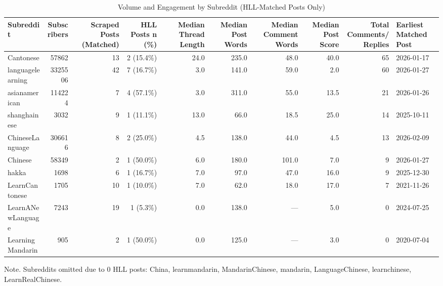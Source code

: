 \documentclass[11pt]{article}
\begin{document}
\begin{table}[ht]
\centering
\begin{threeparttable}
\caption{Volume and Engagement by Subreddit (HLL-Matched Posts Only)}
\vspace{0.35em}
\begin{tabular}{l r r r r r r r r l}
\toprule
Subreddit & Subscribers & Scraped Posts (Matched) & HLL Posts n (\%) & Median Thread Length & Median Post Words & Median Comment Words & Median Post Score & Total Comments/Replies & Earliest Matched Post \\
\midrule
Cantonese & 57862 & 13 & 2 (15.4\%) & 24.0 & 235.0 & 48.0 & 40.0 & 65 & 2026-01-17 \\
languagelearning & 3325506 & 42 & 7 (16.7\%) & 3.0 & 141.0 & 59.0 & 2.0 & 60 & 2026-01-27 \\
asianamerican & 114224 & 7 & 4 (57.1\%) & 3.0 & 311.0 & 55.0 & 13.5 & 21 & 2026-01-26 \\
shanghainese & 3032 & 9 & 1 (11.1\%) & 13.0 & 66.0 & 18.5 & 25.0 & 14 & 2025-10-11 \\
ChineseLanguage & 306616 & 8 & 2 (25.0\%) & 4.5 & 138.0 & 44.0 & 4.5 & 13 & 2026-02-09 \\
Chinese & 58349 & 2 & 1 (50.0\%) & 6.0 & 180.0 & 101.0 & 7.0 & 9 & 2026-01-27 \\
hakka & 1698 & 6 & 1 (16.7\%) & 7.0 & 97.0 & 47.0 & 16.0 & 9 & 2025-12-30 \\
LearnCantonese & 1705 & 10 & 1 (10.0\%) & 7.0 & 62.0 & 18.0 & 17.0 & 7 & 2021-11-26 \\
LearnANewLanguage & 7243 & 19 & 1 (5.3\%) & 0.0 & 138.0 & — & 5.0 & 0 & 2024-07-25 \\
LearningMandarin & 905 & 2 & 1 (50.0\%) & 0.0 & 125.0 & — & 3.0 & 0 & 2020-07-04 \\
\bottomrule
\end{tabular}
\begin{tablenotes}[flushleft]
\footnotesize
\item Note. Subreddits omitted due to 0 HLL posts: China, learnmandarin, MandarinChinese, mandarin, LanguageChinese, learnchinese, LearnRealChinese.
\end{tablenotes}
\end{threeparttable}
\end{table}
\end{document}
